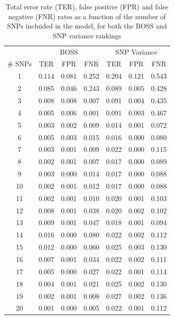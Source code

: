 \begin{table}
\centering
\caption{Total error rate (TER), false positive (FPR) and false negative
  (FNR) rates as a function of the number of SNPs incluided in the
  model, for both the BOSS and SNP variance rankings}
\label{tab:error}       %
\begin{tabular}{ccccccc}
\hline\noalign{\smallskip}
 & \multicolumn{3}{c}{BOSS} & \multicolumn{3}{c}{SNP Variance}\\
\noalign{\smallskip}\hline\noalign{\smallskip}
\# SNPs & TER & FPR & FNR & TER & FPR & FNR\\
\noalign{\smallskip}\hline\noalign{\smallskip}
1 & 0.114 & 0.081 & 0.252 & 0.204 & 0.121 & 0.543\\
2 & 0.085 & 0.046 & 0.243 & 0.089 & 0.005 & 0.428\\
3 & 0.008 & 0.008 & 0.007 & 0.091 & 0.004 & 0.435\\
4 & 0.005 & 0.006 & 0.001 & 0.091 & 0.003 & 0.467\\
5 & 0.003 & 0.002 & 0.009 & 0.014 & 0.001 & 0.072\\
6 & 0.005 & 0.003 & 0.015 & 0.016 & 0.000 & 0.080\\
7 & 0.003 & 0.001 & 0.009 & 0.022 & 0.000 & 0.115\\
8 & 0.002 & 0.001 & 0.007 & 0.017 & 0.000 & 0.089\\
9 & 0.003 & 0.000 & 0.014 & 0.017 & 0.000 & 0.088\\
10 & 0.002 & 0.001 &  0.012 & 0.017 & 0.000 & 0.088\\
11 & 0.002 & 0.001 &  0.010 & 0.020 & 0.001 & 0.103\\
12 & 0.008 & 0.001 &  0.038 & 0.020 & 0.002 & 0.102\\
13 & 0.009 & 0.001 &  0.047 & 0.018 & 0.001 & 0.094\\
14 & 0.016 & 0.000 &  0.080 & 0.022 & 0.002 & 0.112\\
15 & 0.012 & 0.000 &  0.060 & 0.025 & 0.003 & 0.130\\
16 & 0.007 & 0.001 &  0.034 & 0.022 & 0.002 & 0.111\\
17 & 0.005 & 0.000 &  0.027 & 0.022 & 0.001 & 0.114\\
18 & 0.004 & 0.001 &  0.021 & 0.025 & 0.002 & 0.130\\
19 & 0.002 & 0.001 &  0.008 & 0.027 & 0.002 & 0.136\\
20 & 0.001 & 0.000 &  0.005 & 0.022 & 0.001 & 0.112\\

\end{tabular}
\end{table}
